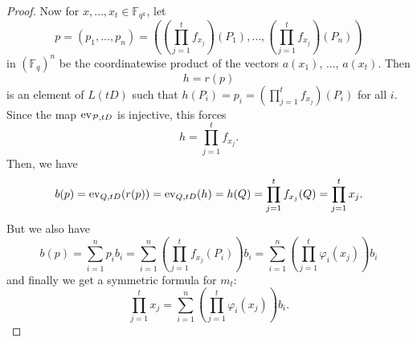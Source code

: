 \documentclass[11pt]{article}
\begin{document}
\begin{proof}
Now for $x,\dots,x_t\in\mathbb{F}_{q^k}$, let
  \[
    p = (p_1,\dots,p_n) = ((\prod_{j=1}^tf_{x_j})(P_1), \dots, (\prod_{j=1}^tf_{x_j})(P_n))
  \]
in $(\mathbb{F}_{q})^n$  be the coordinatewise product of the vectors $a(x_1)$, ..., $a(x_t)$.
Then
\[
  h = r(p)
\]
is an element of $L(tD)$ such that $h(P_i) = p_i = (\prod_{j=1}^tf_{x_j})(P_i)$ for all $i$.
Since the map $\operatorname{ev}_{\mathcal{P}, tD}$ is injective, this forces
\[
  h = \prod_{j=1}^tf_{x_j}.
\]
Then, we have
\begin{equation*}
b(p) = \operatorname{ev}_{Q, tD}(r(p))
  = \operatorname{ev}_{Q, tD}(h)
  = h(Q)
  = \prod_{j=1}^t f_{x_j}(Q)
  = \prod_{j=1}^t x_j.
\end{equation*}
But we also have
\[
  b(p) = \sum_{i=1}^np_ib_i=\sum_{i=1}^n(\prod_{j=1}^tf_{x_j}(P_i))b_i=\sum_{i=1}^n(\prod_{j=1}^t\varphi_i(x_j))b_i
\]
and finally we get a symmetric formula for $m_t$:
\[
  \prod_{j=1}^t x_j = \sum_{i=1}^n(\prod_{j=1}^t\varphi_i(x_j))b_i.
\]
\end{proof}
\end{document}
